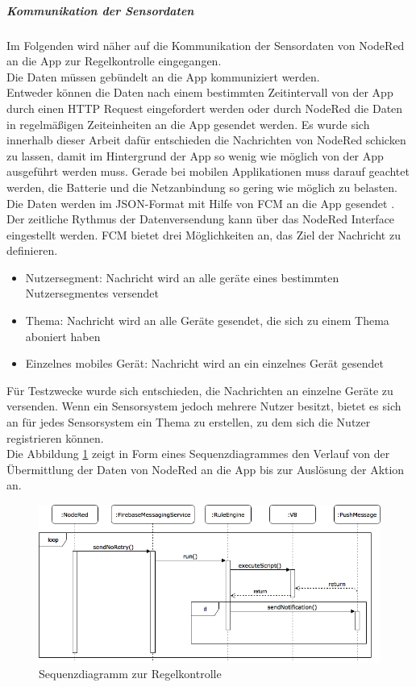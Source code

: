\subparagraph{Kommunikation der Sensordaten}
Im Folgenden wird näher auf die Kommunikation der Sensordaten von NodeRed an die App zur Regelkontrolle eingegangen.\\
Die Daten müssen gebündelt an die App kommuniziert werden.\\
Entweder können die Daten nach einem bestimmten Zeitintervall von der App durch einen HTTP Request eingefordert werden oder durch NodeRed die Daten in regelmäßigen Zeiteinheiten an die App gesendet werden. Es wurde sich innerhalb dieser Arbeit dafür entschieden die Nachrichten von NodeRed schicken zu lassen, damit im Hintergrund der App so wenig wie möglich von der App ausgeführt werden muss. Gerade bei mobilen Applikationen muss darauf geachtet werden, die Batterie und die Netzanbindung so gering wie möglich zu belasten. \\
Die Daten werden im JSON-Format mit Hilfe von \ac{FCM} an die App gesendet \cite{firebase:gcm}. Der zeitliche Rythmus der Datenversendung kann über das NodeRed Interface eingestellt werden. \ac{FCM} bietet drei Möglichkeiten an, das Ziel der Nachricht zu definieren.
\begin{itemize}
	\item Nutzersegment: Nachricht wird an alle geräte eines bestimmten Nutzersegmentes versendet
	\item Thema: Nachricht wird an alle Geräte gesendet, die sich zu einem Thema aboniert haben
	\item Einzelnes mobiles Gerät: Nachricht wird an ein einzelnes Gerät gesendet
\end{itemize}
Für Testzwecke wurde sich entschieden, die Nachrichten an einzelne Geräte zu versenden. Wenn ein Sensorsystem jedoch mehrere Nutzer besitzt, bietet es sich an für jedes Sensorsystem ein Thema zu erstellen, zu dem sich die Nutzer registrieren können.\\
Die Abbildung \ref{fig:sequenzdiagramm} zeigt in Form eines Sequenzdiagrammes den Verlauf von der Übermittlung
der Daten von NodeRed an die App bis zur Auslösung der Aktion an.
\begin{figure}
	\centering
	\includegraphics[width=1\textwidth]{images/Sequenzdiagramm.png}
	\caption{Sequenzdiagramm zur Regelkontrolle}
	\label{fig:sequenzdiagramm}
\end{figure}

